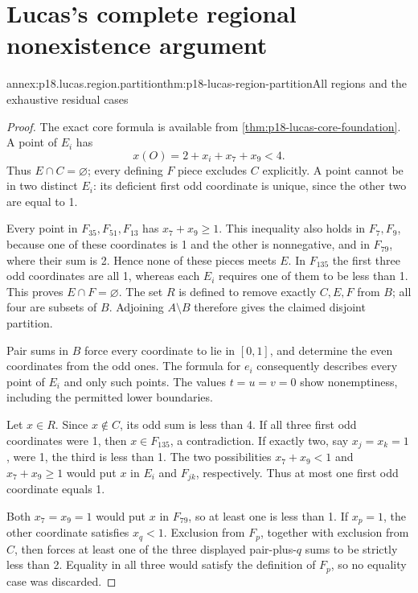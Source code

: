 \section{Lucas's complete regional nonexistence argument}
\label{sec:p18-lucas-no-solution-annex}

\begin{annexitem}{annex:p18.lucas.region.partition}{thm:p18-lucas-region-partition}{All regions and the exhaustive residual cases}
\begin{proof}
The exact core formula is available from
\cref{thm:p18-lucas-core-foundation}. A point of \(E_i\) has
\[
                    x(O)=2+x_i+x_7+x_9<4.
\]
Thus \(E\cap C=\varnothing\); every defining \(F\) piece
excludes \(C\) explicitly. A point cannot be in two distinct
\(E_i\): its deficient first odd coordinate is unique, since
the other two are equal to 1.

Every point in \(F_{35},F_{51},F_{13}\) has \(x_7+x_9\geq1\).
This inequality also holds in \(F_7,F_9\), because one of
these coordinates is 1 and the other is nonnegative, and in
\(F_{79}\), where their sum is 2. Hence none of these pieces
meets \(E\). In \(F_{135}\) the first three odd coordinates
are all 1, whereas each \(E_i\) requires one of them to be
less than 1. This proves \(E\cap F=\varnothing\). The set
\(R\) is defined to remove exactly \(C,E,F\) from \(B\);
all four are subsets of \(B\). Adjoining \(A\setminus B\)
therefore gives the claimed disjoint partition.

Pair sums in \(B\) force every coordinate to lie in \([0,1]\),
and determine the even coordinates from the odd ones.
The formula for \(e_i\) consequently describes every point
of \(E_i\) and only such points. The values \(t=u=v=0\)
show nonemptiness, including the permitted lower boundaries.

Let \(x\in R\). Since \(x\notin C\), its odd sum is less
than 4. If all three first odd coordinates were 1, then
\(x\in F_{135}\), a contradiction. If exactly two, say
\(x_j=x_k=1\), were 1, the third is less than 1. The two
possibilities \(x_7+x_9<1\) and \(x_7+x_9\geq1\) would put
\(x\) in \(E_i\) and \(F_{jk}\), respectively. Thus at most
one first odd coordinate equals 1.

Both \(x_7=x_9=1\) would put \(x\) in \(F_{79}\), so at
least one is less than 1. If \(x_p=1\), the other coordinate
satisfies \(x_q<1\). Exclusion from \(F_p\), together with
exclusion from \(C\), then forces at least one of the three
displayed pair-plus-\(q\) sums to be strictly less than 2.
Equality in all three would satisfy the definition of
\(F_p\), so no equality case was discarded.
\end{proof}
\end{annexitem}

